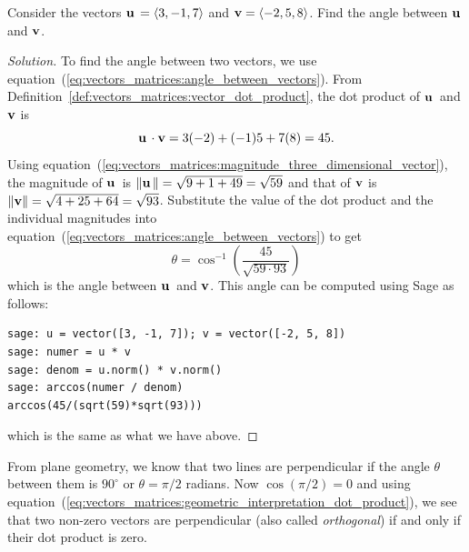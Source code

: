 \begin{example}
Consider the vectors $\operatorname*{\mathbf{u}}{} = \langle 3, -1, 7 \rangle$
and $\operatorname*{\mathbf{v}} = \langle -2, 5, 8 \rangle$. Find the angle
between $\operatorname*{\mathbf{u}}{}$ and $\operatorname*{\mathbf{v}}$.
\end{example}

\begin{proof}[Solution]
To find the angle between two vectors, we use
equation~(\ref{eq:vectors_matrices:angle_between_vectors}). From
Definition~\ref{def:vectors_matrices:vector_dot_product}, the dot
product of $\operatorname*{\mathbf{u}}{}$ and $\operatorname*{\mathbf{v}}$ is
\[
\operatorname*{\mathbf{u}}{} \cdot \operatorname*{\mathbf{v}}
=
3(-2) + (-1)5 + 7(8)
=
45.
\]
Using
equation~(\ref{eq:vectors_matrices:magnitude_three_dimensional_vector}),
the magnitude of $\operatorname*{\mathbf{u}}{}$ is
$\left\Arrowvert \operatorname*{\mathbf{u}}{} \right\Arrowvert = \sqrt{9 + 1 + 49} = \sqrt{59}$ and that
of $\operatorname*{\mathbf{v}}$ is
$\left\Arrowvert \operatorname*{\mathbf{v}} \right\Arrowvert = \sqrt{4 + 25 + 64} = \sqrt{93}$.
Substitute the value of the dot product and the individual magnitudes
into equation~(\ref{eq:vectors_matrices:angle_between_vectors}) to get
\[
\theta
=
\cos^{-1} \left( \frac{45}{\sqrt{59 \cdot 93}} \right)
\]
which is the angle between $\operatorname*{\mathbf{u}}{}$ and $\operatorname*{\mathbf{v}}$. This angle can
be computed using Sage as follows:
%
\begin{lstlisting}
sage: u = vector([3, -1, 7]); v = vector([-2, 5, 8])
sage: numer = u * v
sage: denom = u.norm() * v.norm()
sage: arccos(numer / denom)
arccos(45/(sqrt(59)*sqrt(93)))
\end{lstlisting}
%
which is the same as what we have above.
\end{proof}

From plane geometry, we know that two lines are perpendicular if the
angle $\theta$ between them is $90^{\circ}$ or $\theta = \pi / 2$
radians. Now $\cos (\pi / 2) = 0$ and using
equation~(\ref{eq:vectors_matrices:geometric_interpretation_dot_product}), we see that
two non-zero vectors are perpendicular (also called
\emph{orthogonal}) if and only if their dot
product is zero.
